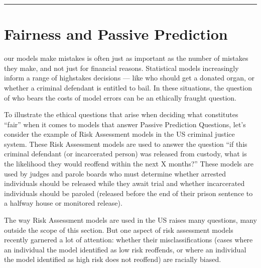 \documentclass[letterpaper,10pt,english]{jupyterBook}
\begin{document}
\bigskip\hrule\bigskip


\sphinxstepscope


\section{Fairness and Passive Prediction}
\label{\detokenize{30_questions/25_passive_fairness:fairness-and-passive-prediction}}\label{\detokenize{30_questions/25_passive_fairness::doc}}
\sphinxAtStartPar
{} our models make mistakes is often just as important as the number of mistakes they make, and not just for financial reasons. Statistical models increasingly inform a range of high\sphinxhyphen{}stakes decisions — like who should get a donated organ, or whether a criminal defendant is entitled to bail. In these situations, the question of who bears the costs of model errors can be an ethically fraught question.

\sphinxAtStartPar
To illustrate the ethical questions that arise when deciding what constitutes “fair” when it comes to models that answer Passive Prediction Questions, let’s consider the example of Risk Assessment models in the US criminal justice system. These Risk Assessment models are used to answer the question “if this criminal defendant (or incarcerated person) was released from custody, what is the likelihood they would re\sphinxhyphen{}offend within the next X months?” These models are used by judges and parole boards who must determine whether arrested individuals should be released while they await trial and whether incarcerated individuals should be paroled (released before the end of their prison sentence to a half\sphinxhyphen{}way house or monitored release).

\sphinxAtStartPar
The way Risk Assessment models are used in the US raises many questions, many outside the scope of this section. But one aspect of risk assessment models recently garnered a lot of attention: whether their misclassifications (cases where an individual the model identified as low risk re\sphinxhyphen{}offends, or where an individual the model identified as high risk does not re\sphinxhyphen{}offend) are racially biased.
\end{document}
